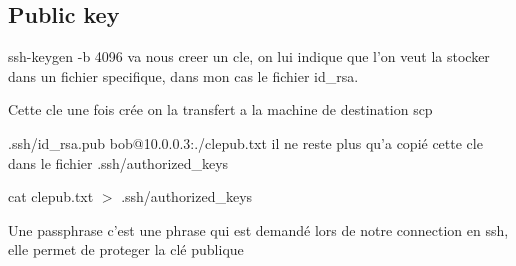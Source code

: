 \documentclass{article}
\begin{document}
 
 
 \subsection{\large{Public key}}
 
 ssh-keygen -b 4096 va nous creer un cle, on lui indique que l'on veut la stocker dans un fichier specifique, dans mon cas le fichier id\_rsa.\par 
 Cette cle une fois crée on la transfert a la machine de destination scp\par
 .ssh/id\_rsa.pub bob@10.0.0.3:./clepub.txt
 il ne reste plus qu'a copié cette cle dans le fichier .ssh/authorized\_keys \par
  cat clepub.txt $>$ .ssh/authorized\_keys
 \\\par
 Une passphrase c’est une phrase qui est demandé lors de notre connection en ssh, elle permet de proteger la clé publique

 
\end{document}
